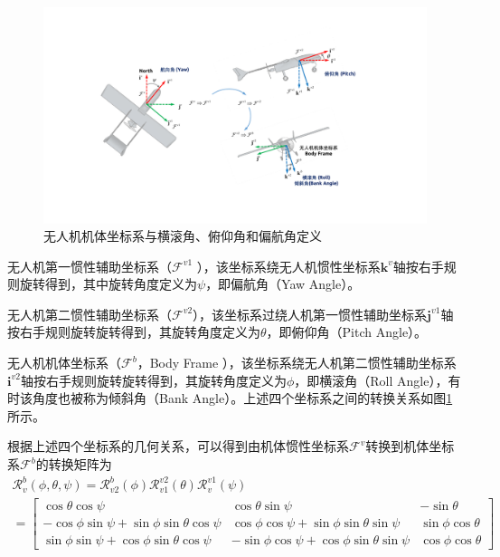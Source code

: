 \begin{figure}[htb]   
	\centering
	\includegraphics[width=\textwidth]{figs/chp02/chp02_02_uav_rpy.pdf}
	\caption{无人机机体坐标系与横滚角、俯仰角和偏航角定义}
	\label{fig:chp02_02_uav_rpy}
\end{figure}

无人机第一惯性辅助坐标系（$\mathcal{F}^{v1}$ ），该坐标系绕无人机惯性坐标系$\mathbf{k}^v$轴按右手规则旋转得到，其中旋转角度定义为$\psi$，即偏航角（Yaw Angle）。

无人机第二惯性辅助坐标系（$\mathcal{F}^{v2}$），该坐标系过绕人机第一惯性辅助坐标系$\mathbf{j}^{v1}$轴按右手规则旋转旋转得到，其旋转角度定义为$\theta$，即俯仰角（Pitch Angle）。

无人机机体坐标系（$\mathcal{F}^b$，Body Frame ），该坐标系绕无人机第二惯性辅助坐标系$\mathbf{i}^{v2}$轴按右手规则旋转旋转得到，其旋转角度定义为$\phi$，即横滚角（Roll Angle），有时该角度也被称为倾斜角（Bank Angle）。上述四个坐标系之间的转换关系如图\ref{fig:chp02_02_uav_rpy}所示。

根据上述四个坐标系的几何关系，可以得到由机体惯性坐标系$\mathcal{F}^v$转换到机体坐标系$\mathcal{F}^b$的转换矩阵为
\begin{multline}
\mathcal{R}_v^b(\phi, \theta, \psi) =\mathcal{R}_{v2}^b(\phi)\mathcal{R}_{v1}^{v2}(\theta)\mathcal{R}_v^{v1}(\psi) \\
=\begin{bmatrix}
\cos \theta \cos \psi                             & \cos\theta \sin\psi                               & -\sin\theta         \\
-\cos\phi \sin\psi + \sin\phi \sin\theta \cos\psi & \cos\phi \cos\psi + \sin\phi \sin\theta\sin\psi   & \sin\phi \cos\theta \\
\sin\phi \sin\psi + \cos\phi \sin\theta \cos\psi  & -\sin\phi \cos\psi + \cos\phi \sin\theta \sin\psi & \cos\phi \cos\theta
\end{bmatrix}
\end{multline}


